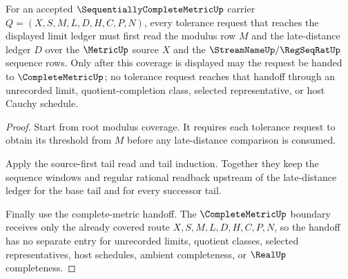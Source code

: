 \begin{theorem}
\label{thm:sequentially-complete-metric-limit-ledger-coverage}
For an accepted $\SequentiallyCompleteMetricUp$ carrier $Q=(X,S,M,L,D,H,C,P,N)$, every tolerance request that reaches the displayed limit ledger must first read the modulus row $M$ and the late-distance ledger $D$ over the $\MetricUp$ source $X$ and the $\StreamNameUp/\RegSeqRatUp$ sequence rows. Only after this coverage is displayed may the request be handed to $\CompleteMetricUp$; no tolerance request reaches that handoff through an unrecorded limit, quotient-completion class, selected representative, or host Cauchy schedule.
\end{theorem}
\begin{proof}
Start from root modulus coverage. It requires each tolerance request to obtain its threshold from $M$ before any late-distance comparison is consumed.

Apply the source-first tail read and tail induction. Together they keep the sequence windows and regular rational readback upstream of the late-distance ledger for the base tail and for every successor tail.

Finally use the complete-metric handoff. The $\CompleteMetricUp$ boundary receives only the already covered route $X,S,M,L,D,H,C,P,N$, so the handoff has no separate entry for unrecorded limits, quotient classes, selected representatives, host schedules, ambient completeness, or $\RealUp$ completeness.
\end{proof}

